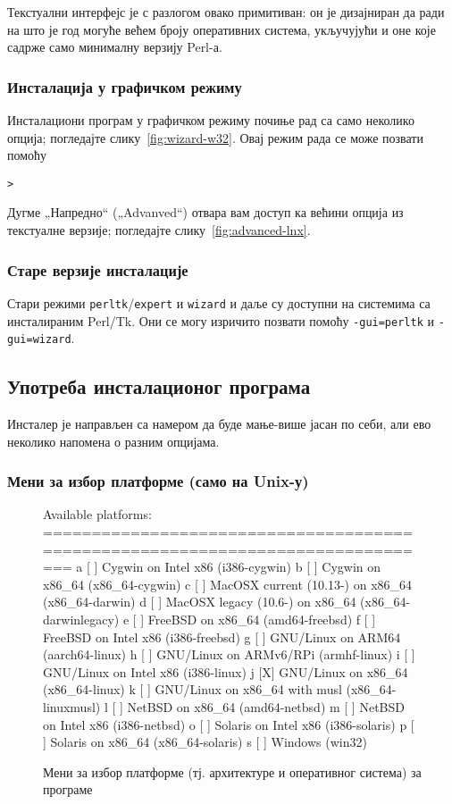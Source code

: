 \documentclass{article}
\begin{document}
Текстуални интерфејс је с разлогом овако примитиван: он је дизајниран
да ради на што је год могуће већем броју оперативних система,
укључујући и оне које садрже само минималну верзију Perl-а.


\subsubsection{Инсталација у графичком режиму}
\label{sec:graphical-inst}

Инсталациони програм у графичком режиму почиње рад са само неколико
опција; погледајте слику~\ref{fig:wizard-w32}. Овај режим рада се може 
позвати помоћу
\begin{alltt}> 
\end{alltt}
Дугме „Напредно“ („Advanved“) отвара вам доступ ка већини опција
из текстуалне верзије; погледајте слику~\ref{fig:advanced-lnx}.


\subsubsection{Старе верзије инсталације}

Стари режими \texttt{perltk}/\texttt{expert} и \texttt{wizard} 
и даље су доступни на системима са инсталираним Perl/Tk. Они се могу
изричито позвати помоћу \texttt{-gui=perltk} и \texttt{-gui=wizard}.


\subsection{Употреба инсталационог програма}
\label{sec:runinstall}

Инсталер је направљен са намером да буде мање-више јасан по себи, али
ево неколико напомена о разним опцијама.

\subsubsection{Мени за избор платформе (само на Unix-у)}
\label{sec:binary}

\begin{figure}[tb]
\begin{boxedverbatim}
Available platforms:
===============================================================================
  a [ ] Cygwin on Intel x86 (i386-cygwin)
  b [ ] Cygwin on x86_64 (x86_64-cygwin)
  c [ ] MacOSX current (10.13-) on x86_64 (x86_64-darwin)
  d [ ] MacOSX legacy (10.6-) on x86_64 (x86_64-darwinlegacy)
  e [ ] FreeBSD on x86_64 (amd64-freebsd)
  f [ ] FreeBSD on Intel x86 (i386-freebsd)
  g [ ] GNU/Linux on ARM64 (aarch64-linux)
  h [ ] GNU/Linux on ARMv6/RPi (armhf-linux)
  i [ ] GNU/Linux on Intel x86 (i386-linux)
  j [X] GNU/Linux on x86_64 (x86_64-linux)
  k [ ] GNU/Linux on x86_64 with musl (x86_64-linuxmusl)
  l [ ] NetBSD on x86_64 (amd64-netbsd)
  m [ ] NetBSD on Intel x86 (i386-netbsd)
  o [ ] Solaris on Intel x86 (i386-solaris)
  p [ ] Solaris on x86_64 (x86_64-solaris)
  s [ ] Windows (win32)
\end{boxedverbatim}
\caption{Мени за избор платформе (тј. архитектуре и оперативног система) за програме}\label{fig:bin-text}
\end{figure}
\end{document}
